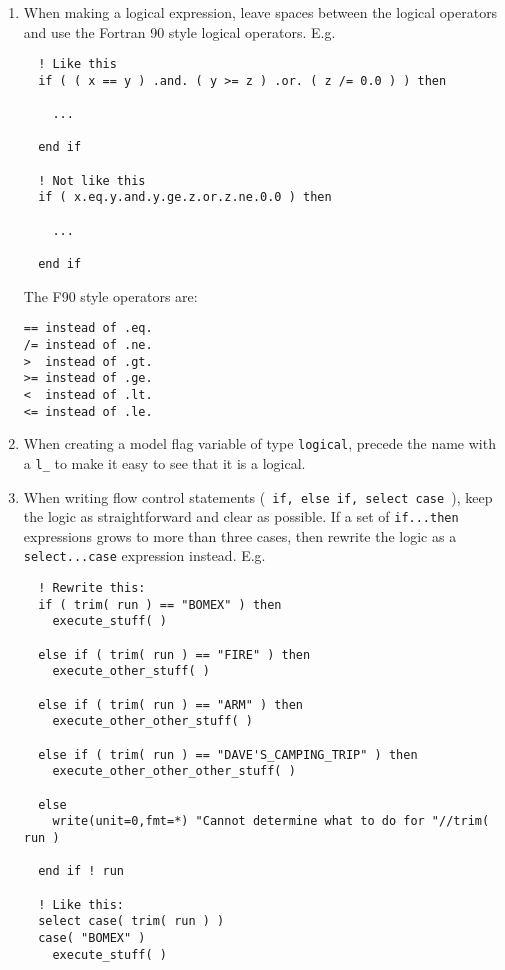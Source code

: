 \documentclass[letterpaper,12pt]{article}
\begin{document}
\begin{enumerate}
\item When making a logical expression, leave spaces between the 
logical operators and use the Fortran 90 style logical operators. \newline
 E.g.
\begin{verbatim}
  ! Like this
  if ( ( x == y ) .and. ( y >= z ) .or. ( z /= 0.0 ) ) then

    ...

  end if

  ! Not like this
  if ( x.eq.y.and.y.ge.z.or.z.ne.0.0 ) then

    ...

  end if

\end{verbatim}

The F90 style operators are:
\newline

\begin{verbatim}
== instead of .eq.
/= instead of .ne.
>  instead of .gt.
>= instead of .ge.
<  instead of .lt.
<= instead of .le.
\end{verbatim}

\item When creating a model flag variable of type \texttt{logical}, precede the
 name with a \verb|l_| to make it easy to see that it is a logical.

\item When writing flow control statements 
(\texttt{ if, else if, select case }), keep the logic as straightforward and
clear as possible.  If a set of \texttt{if...then} expressions grows to more
than three cases, then rewrite the logic as a \texttt{select...case} expression
instead. E.g.

\begin{verbatim}
  ! Rewrite this:
  if ( trim( run ) == "BOMEX" ) then
    execute_stuff( )

  else if ( trim( run ) == "FIRE" ) then
    execute_other_stuff( )

  else if ( trim( run ) == "ARM" ) then
    execute_other_other_stuff( ) 

  else if ( trim( run ) == "DAVE'S_CAMPING_TRIP" ) then
    execute_other_other_other_stuff( ) 

  else
    write(unit=0,fmt=*) "Cannot determine what to do for "//trim( run )

  end if ! run

  ! Like this:
  select case( trim( run ) )
  case( "BOMEX" )
    execute_stuff( )


\end{verbatim}
\end{enumerate}
\end{document}
